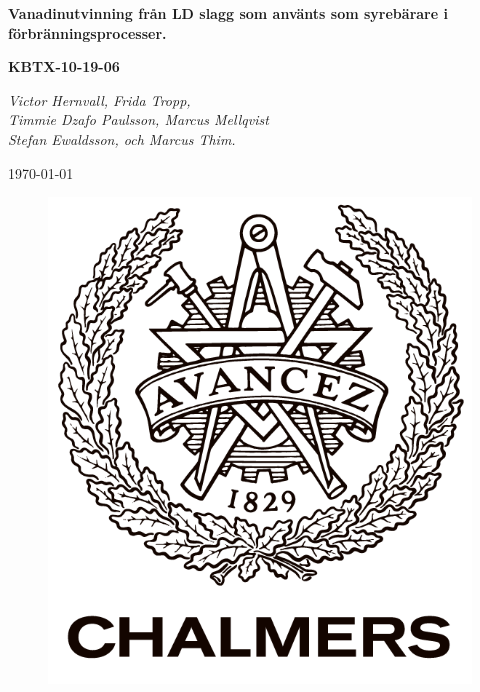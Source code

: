 
\begin{titlepage}
\begin{centering}

{\huge\bfseries Vanadinutvinning från LD slagg som använts som syrebärare i förbränningsprocesser. \par}
\vspace{1cm}
{\scshape\Large \textbf{KBTX-10-19-06}\par}
{\scshape\Large \par}
{\Large\itshape Victor Hernvall, Frida Tropp,  \\ Timmie Dzafo Paulsson, Marcus Mellqvist \\ Stefan Ewaldsson, och Marcus Thim.\par}
{\large \today\par}

{   \par}
{   \par}
{    \par}


\begin{figure}[!ht]
\centering
\includegraphics[scale=0.3]{chalmers.png}
\label{fig:chalmers}

\end{figure}


\end{centering}
\end{titlepage}

